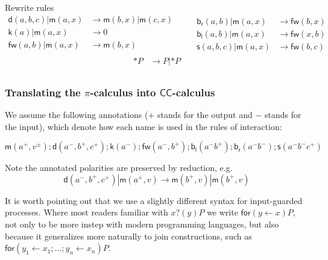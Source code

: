 \documentclass[submission,copyright,creativecommons]{eptcs}
\newcommand{\pic}{$\pi$-calculus}
\newcommand{\ccomb}{$\mathsf{CC}$-calculus}
\newcommand{\scong}{\mathbin{\equiv}}
\newcommand{\binpar}[2]{#1 | #2}
\newcommand{\red}{\rightarrow}
\theoremstyle{definition}
\theoremstyle{remark}
\theoremstyle{remark}
\begin{document}
\noindent Rewrite rules
\[\begin{array}{rl}
  \mathsf{d}(a,b,c) | \mathsf{m}(a,x) & \red \mathsf{m}(b,x) | \mathsf{m}(c,x) \\
  \mathsf{k}(a) | \mathsf{m}(a,x) & \red 0 \\
  \mathsf{fw}(a,b) | \mathsf{m}(a,x) & \red \mathsf{m}(b,x) \\
\end{array} \quad \quad
\begin{array}{rl}
  \mathsf{b}_{\mathsf{r}}(a,b) | \mathsf{m}(a,x) & \red \mathsf{fw}(b,x) \\
  \mathsf{b}_{\mathsf{l}}(a,b) | \mathsf{m}(a,x) & \red \mathsf{fw}(x,b) \\
  \mathsf{s}(a,b,c) | \mathsf{m}(a,x) & \red \mathsf{fw}(b,c)
\end{array}\]
\[\begin{array}{rl}
  \mathsf{*}P & \red P|\mathsf{*}P \\
\end{array}\]

\subsubsection{Translating the {\pic} into {\ccomb}}
We assume the following annotations ($+$ stands for the output and $-$
stands for the input), which denote how each name is used in the rules
of interaction:

\[\mathsf{m}(a^{+},v^{\pm});\mathsf{d}(a^{-},b^{+},c^{+});\mathsf{k}(a^{-});\mathsf{fw}(a^{-},b^{+});\mathsf{b}_{\mathsf{l}}(a^{-}b^{+});\mathsf{b}_{\mathsf{r}}(a^{-}b^{-});\mathsf{s}(a^{-}b^{-}c^{+})\]

Note the annotated polarities are preserved by reduction, e.g.
\[\binpar{\mathsf{d}(a^{-},b^{+},c^{+})}{\mathsf{m}(a^{+},v)} \to \binpar{\mathsf{m}(b^{+},v)}{\mathsf{m}(b^{+},v)}\]

It is worth pointing out that we use a slightly different syntax for input-guarded processes. Where most readers familiar with $x?(y)P$ we write $\mathsf{for}(y \leftarrow x)P$, not only to be more instep with modern programming languages, but also because it generalizes more naturally to join constructions, such as $\mathsf{for}(y_1 \leftarrow x_1; \ldots; y_n \leftarrow x_n)P$.
\end{document}
